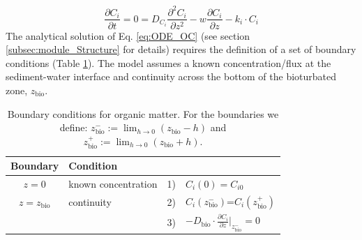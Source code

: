 \documentclass[gmd, manuscript]{copernicus}
\begin{document}
\begin{equation}
 \frac{\partial C_i}{\partial t} = 0= D_{C_i} \frac{\partial^2C_i }{\partial z^2} - w\frac{\partial C_i }{\partial z} - k_i\cdot C_{i} \label{eq:ODE_OC}
\end{equation}
The analytical solution of Eq. \eqref{eq:ODE_OC} (see section \ref{subsec:module_Structure} for details) requires the definition of a set of boundary conditions (Table \ref{Tab:BC_OM}). 
The model assumes a known concentration/flux at the sediment-water interface and continuity across the bottom of the bioturbated zone, $z_{\mathrm{bio}}$.
\begin{table}[tbp]
\caption{Boundary conditions for organic matter. For the boundaries we define:  $z_{\mathrm{bio}}^- := \lim_{h\to0} (z_{\mathrm{bio}}-h)$ and $z_{\mathrm{bio}}^+ := \lim_{h\to0} (z_{\mathrm{bio}}+h)$.}
\centering
\begin{tabular}{ |c| l| c l|}
\hline
\textbf{Boundary}& \textbf{Condition}& &\\
\hline
$z=0$& known concentration& 1)& $C_i(0)=C_{i0}$\\
$z=z_{\mathrm{bio}}$&continuity& 2)& $C_i(z_{\mathrm{bio}}^-)$=$C_i(z_{\mathrm{bio}}^+)$\\
               &&3)&$-D_{\mathrm{bio}}\cdot \frac{\partial C_i}{\partial z}|_{z_{\mathrm{bio}}^-}=0$\\
\hline
\end{tabular}
\label{Tab:BC_OM}
\end{table}
\end{document}

